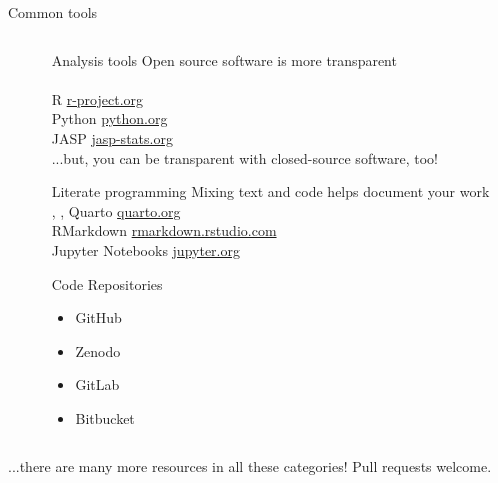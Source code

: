 \begin{block}{Common tools}
\begin{columns}[t]
\begin{column}{.45\linewidth}
  \end{column}\hfill
   \begin{column}{.45\linewidth}

\begin{subblock}{ \hfill Analysis tools\hfill {}}
Open source software is more transparent \\ \vspace{0.5em}
\\  R \href{https://www.r-project.org/}{r-project.org}
\\  Python \href{https://www.python.org/}{python.org}
\\ JASP \href{https://jasp-stats.org/}{jasp-stats.org} \\ \vspace{0.5em}
...but, you can be transparent with closed-source software, too!
  \end{subblock}
   
\begin{subblock}{\hfill Literate programming\hfill {}}
Mixing text and code helps document your work \\ \vspace{0.5em} , ,   Quarto \href{https://quarto.org/}{quarto.org}
\\  RMarkdown \href{https://rmarkdown.rstudio.com/}{rmarkdown.rstudio.com}
\\  Jupyter Notebooks \href{https://jupyter.org/
}{jupyter.org}
  \end{subblock}

  \begin{subblock}{\hfill Code Repositories\hfill {}}
\begin{itemize}
    \item GitHub 
    \item Zenodo
    \item GitLab 
    \item Bitbucket 

\end{itemize}
  \end{subblock}
  \end{column}\hfill\hfill\hfill

  \end{columns}
   ...there are many more resources in all these categories! Pull requests welcome.   
   

\end{block}